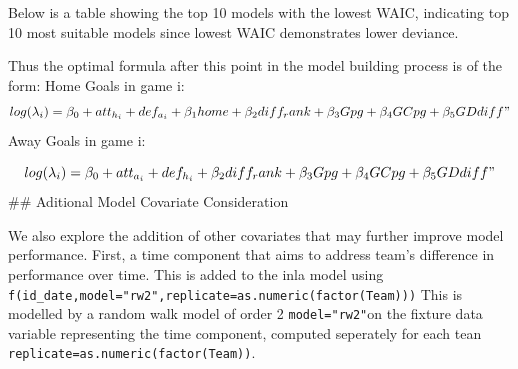 \documentclass[
]{article}
\begin{document}
Below is a table showing the top 10 models with the lowest WAIC,
indicating top 10 most suitable models since lowest WAIC demonstrates
lower deviance.

\begin{table}[!h]

\caption{\label{tab:unnamed-chunk-7}Top 10 Model Combinations By WAIC}
\centering
{}
\end{table}

Thus the optimal formula after this point in the model building process
is of the form: Home Goals in game i:
\[log(\lambda_{i}) = \beta_0 +  att_{h_i} + def_{a_i} + \beta_1 home + \beta_2 diff_rank + \beta_3 Gpg + \beta_4 GCpg +  \beta_5GDdiff"\]
Away Goals in game i:

\[log(\lambda_{i}) = \beta_0 +  att_{a_i} + def_{h_i} +  \beta_2 diff_rank + \beta_3 Gpg + \beta_4 GCpg +  \beta_5GDdiff"\]
\#\# Aditional Model Covariate Consideration

We also explore the addition of other covariates that may further
improve model performance. First, a time component that aims to address
team's difference in performance over time. This is added to the inla
model using
\texttt{f(id\_date,model="rw2",replicate=as.numeric(factor(Team)))} This
is modelled by a random walk model of order 2 \texttt{model="rw2"}on the
fixture data variable representing the time component, computed
seperately for each tean \texttt{replicate=as.numeric(factor(Team))}.
\end{document}
